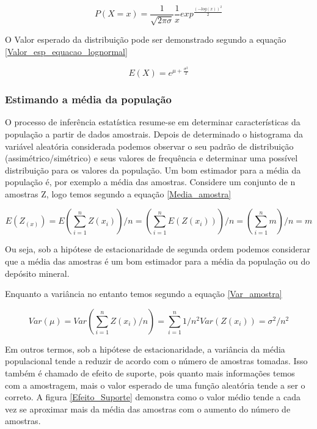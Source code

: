 \begin{equation}\label{equacao_lognormal}
P(X = x) = \frac{1}{\sqrt{2\pi\sigma}}\frac{1}{x}exp^{\frac{(-log(x))^2}{2}}
\end{equation}

O Valor esperado da distribuição pode ser demonstrado segundo a equação \eqref{Valor_esp_equacao_lognormal}

\begin{equation}\label{Valor_esp_equacao_lognormal}
E(X) = e^{\mu + \frac{\sigma^2}{2}}
\end{equation}



\subsubsection{Estimando a média da população }

O processo de inferência estatística resume-se em determinar características da população a partir de dados amostrais. Depois de determinado o histograma da variável aleatória considerada podemos observar o seu padrão de distribuição (assimétrico/simétrico) e seus valores de frequência e determinar uma possível distribuição para os valores da população. Um bom estimador para a média da população é, por exemplo a média das amostras. Considere um conjunto de n amostras Z, logo temos segundo a equação \eqref{Media_amostra} 

\begin{equation}\label{Media_amostra}
E(Z_(x)) = E\left(\sum_{i=1}^{n} Z(x_{i})\right)/n= \left(\sum_{i=1}^{n} E(Z(x_{i}))\right)/n = \left(\sum_{i=1}^{n} m\right)/n = m
\end{equation}

Ou seja, sob a hipótese de estacionaridade de segunda ordem podemos considerar que a média das amostras é um bom estimador para a média da população ou do depósito mineral. 

Enquanto a variância no entanto temos segundo a equação \eqref{Var_amostra}

\begin{equation}\label{Var_amostra}
Var(\mu) = Var\left(\sum_{i=1}^{n} Z(x_{i})/n\right) = \sum_{i=1}^{n} 1/n^2Var\left(Z(x_{i})\right)= \sigma^2/n^2
\end{equation}

Em outros termos, sob a hipótese de estacionaridade, a variância da média populacional tende a reduzir de acordo com o número de amostras tomadas. Isso também é chamado de efeito de suporte, pois quanto mais informações temos com a amostragem, mais o valor esperado de uma função aleatória tende a ser o correto. A figura \eqref{Efeito_Suporte} demonstra como o valor médio tende a cada vez se aproximar mais da média das amostras com o aumento do número de amostras.

